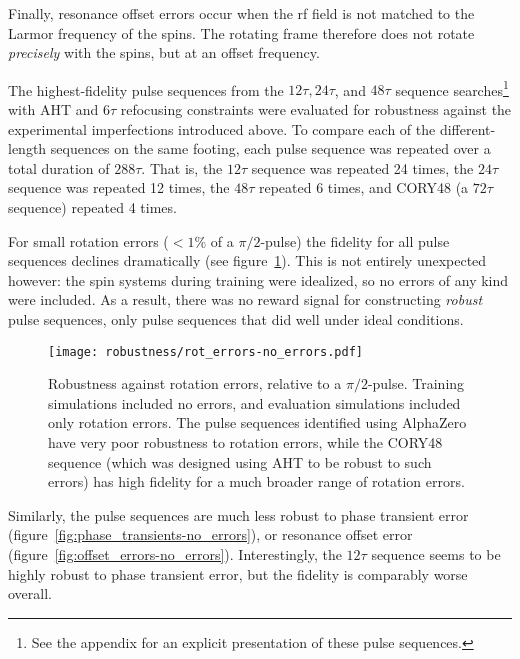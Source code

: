Finally, resonance offset errors occur when the rf field is not matched to the Larmor frequency of the spins. The rotating frame therefore does not rotate \emph{precisely} with the spins, but at an offset frequency.

The highest-fidelity pulse sequences from the $12\tau, 24\tau$, and $48\tau$ sequence searches\footnote{
See the appendix for an explicit presentation of these pulse sequences.
} with AHT and $6\tau$ refocusing constraints were evaluated for robustness against the experimental imperfections introduced above. To compare each of the different-length sequences on the same footing, each pulse sequence was repeated over a total duration of $288\tau$. That is, the $12\tau$ sequence was repeated 24 times, the $24\tau$ sequence was repeated 12 times, the $48\tau$ repeated 6 times, and CORY48 (a $72\tau$ sequence) repeated 4 times.



For small rotation errors ($<1\%$ of a $\pi/2$-pulse) the fidelity for all pulse sequences declines dramatically (see figure~\ref{fig:rot_errors-no_errors}).
This is not entirely unexpected however: the spin systems during training were idealized, so no errors of any kind were included. As a result, there was no reward signal for constructing \emph{robust} pulse sequences, only pulse sequences that did well under ideal conditions.





\begin{figure}[H]
    \centering
    \texttt{[image: robustness/rot\_errors-no\_errors.pdf]}
    \caption{Robustness against rotation errors, relative to a $\pi/2$-pulse. Training simulations included no errors, and evaluation simulations included only rotation errors.
    The pulse sequences identified using AlphaZero have very poor robustness to rotation errors, while the CORY48 sequence (which was designed using AHT to be robust to such errors) has high fidelity for a much broader range of rotation errors.
    }
    \label{fig:rot_errors-no_errors}
\end{figure}

Similarly, the pulse sequences are much less robust to phase transient error (figure~\ref{fig:phase_transients-no_errors}), or
resonance offset error (figure~\ref{fig:offset_errors-no_errors}). Interestingly, the $12\tau$ sequence seems to be highly robust to phase transient error, but the fidelity is comparably worse overall.


